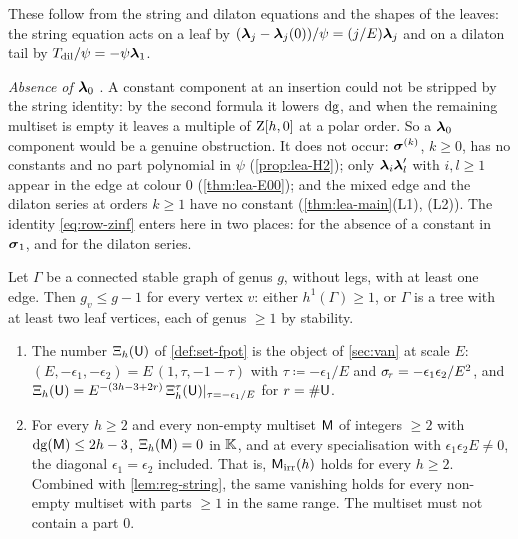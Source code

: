 These follow from the string and dilaton equations and the shapes of the leaves: the string equation acts on a leaf by $(\boldsymbol{\lambda}_j-\boldsymbol{\lambda}_j(0))/\psi=(j/E)\boldsymbol{\lambda}_j$ and on a dilaton tail by $T_{\mathrm{dil}}/\psi=-\psi\boldsymbol{\lambda}_1$.

\emph{Absence of $\boldsymbol{\lambda}_0$} . A constant component at an insertion could not be stripped by the string identity: by the second formula it lowers $\mathrm{dg}$, and when the remaining multiset is empty it leaves a multiple of $\mathrm{Z}[h,0]$ at a polar order. So a $\boldsymbol{\lambda}_0$ component would be a genuine obstruction. It does not occur: $\boldsymbol{\sigma}^{(k)}$, $k\geq0$, has no constants and no part polynomial in $\psi$ (\cref{prop:lea-H2}); only $\boldsymbol{\lambda}_i\boldsymbol{\lambda}_l'$ with $i,l\geq1$ appear in the edge at colour $0$ (\cref{thm:lea-E00}); and the mixed edge and the dilaton series at orders $k\geq1$ have no constant (\cref{thm:lea-main}\textup{(L1), (L2)}). The identity \eqref{eq:row-zinf} enters here in two places: for the absence of a constant in $\boldsymbol{\sigma}_1$, and for the dilaton series.

\begin{lem}
\label{lem:reg-range}
Let $\Gamma$ be a connected stable graph of genus $g$, without legs, with at least one edge. Then $g_{v}\leq g-1$ for every vertex $v$: either $h^1(\Gamma)\geq1$, or $\Gamma$ is a tree with at least two leaf vertices, each of genus $\geq1$ by stability.
\end{lem}

\begin{lem}
\label{lem:reg-A}\leavevmode
\begin{enumerate}
\item[(a)] The number $\Xi_h(\mathsf{U})$ of \cref{def:set-fpot} is the object of \cref{sec:van} at scale $E$: $(E,-\epsilon_1,-\epsilon_2)=E\,(1,\tau,-1-\tau)$ with $\tau\coloneqq-\epsilon_1/E$ and $\sigma_{\!\tau}=-\epsilon_1\epsilon_2/E^2$, and $\Xi_h(\mathsf{U})=E^{-(3h-3+2r)}\,\Xi^{\tau}_h(\mathsf{U})|_{\tau=-\epsilon_1/E}$ for $r=\#\mathsf{U}$.
\item[(b)] For every $h\geq 2$ and every non-empty multiset $\mathsf{M}$ of integers $\geq 2$ with $\mathrm{dg}(\mathsf{M})\leq 2h-3$, $\Xi_h(\mathsf{M})=0$ in $\mathbb{K}$, and at every specialisation with $\epsilon_1\epsilon_2E\neq 0$, the diagonal $\epsilon_1=\epsilon_2$ included. That is, $\mathsf{M}_{\mathrm{irr}}(h)$ holds for every $h\geq 2$. Combined with \cref{lem:reg-string}, the same vanishing holds for every non-empty multiset with parts $\geq 1$ in the same range. The multiset must not contain a part $0$.
\end{enumerate}
\end{lem}

